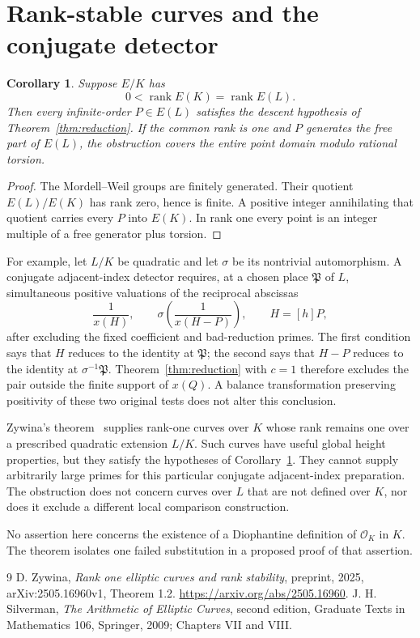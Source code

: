 \documentclass[11pt,a4paper]{article}
\newtheorem{corollary}[theorem]{Corollary}
\begin{document}
\section{Rank-stable curves and the conjugate detector}

\begin{corollary}\label{cor:rankstable}
Suppose $E/K$ has
\[
 0<\operatorname{rank}E(K)=\operatorname{rank}E(L).
\]
Then every infinite-order $P\in E(L)$ satisfies the descent
hypothesis of Theorem~\ref{thm:reduction}. If the common rank is
one and $P$ generates the free part of $E(L)$, the obstruction
covers the entire point domain modulo rational torsion.
\end{corollary}
\begin{proof}
The Mordell--Weil groups are finitely generated. Their quotient
$E(L)/E(K)$ has rank zero, hence is finite. A positive integer
annihilating that quotient carries every $P$ into $E(K)$.
In rank one every point is an integer multiple of a free
generator plus torsion.
\end{proof}

For example, let $L/K$ be quadratic and let $\sigma$ be its
nontrivial automorphism. A conjugate adjacent-index detector
requires, at a chosen place $\mathfrak P$ of $L$, simultaneous
positive valuations of the reciprocal abscissas
\[
 \frac1{x(H)},\qquad
 \sigma\left(\frac1{x(H-P)}\right),\qquad H=[h]P,
\]
after excluding the fixed coefficient and bad-reduction primes.
The first condition says that $H$ reduces to the identity at
$\mathfrak P$; the second says that $H-P$ reduces to the identity
at $\sigma^{-1}\mathfrak P$. Theorem~\ref{thm:reduction} with
$c=1$ therefore excludes the pair outside the finite support of
$x(Q)$. A balance transformation preserving positivity of these
two original tests does not alter this conclusion.

Zywina's theorem~\cite[Theorem 1.2]{Zywina} supplies rank-one
curves over $K$ whose rank remains one over a prescribed quadratic
extension $L/K$. Such curves have useful global height properties,
but they satisfy the hypotheses of Corollary~\ref{cor:rankstable}.
They cannot supply arbitrarily large primes for this particular
conjugate adjacent-index preparation. The obstruction does not
concern curves over $L$ that are not defined over $K$, nor does it
exclude a different local comparison construction.

No assertion here concerns the existence of a Diophantine
definition of $\mathcal O_K$ in $K$. The theorem isolates one
failed substitution in a proposed proof of that assertion.

\begin{thebibliography}{9}
D. Zywina, \emph{Rank one elliptic curves and rank stability},
preprint, 2025, arXiv:2505.16960v1, Theorem 1.2.
\url{https://arxiv.org/abs/2505.16960}.
J. H. Silverman, \emph{The Arithmetic of Elliptic Curves},
second edition, Graduate Texts in Mathematics 106,
Springer, 2009; Chapters VII and VIII.
\end{thebibliography}
\end{document}
